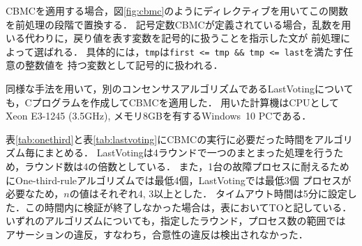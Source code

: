 \documentclass[technicalreport]{ieicej}
\theoremstyle{plain}
\begin{document}
CBMCを適用する場合，図\ref{fig:cbmc}のようにディレクティブを用いてこの関数を前処理の段階で置換する．
記号定数CBMCが定義されている場合，乱数を用いる代わりに，戻り値を表す変数を記号的に扱うことを指示した文が
前処理によって選ばれる．
具体的には，\verb|tmp|は\verb|first <= tmp && tmp <= last|を満たす任意の整数値を
持つ変数として記号的に扱われる．


%

同様な手法を用いて，別のコンセンサスアルゴリズムであるLastVoting\cite{HOjournal}についても，Cプログラムを作成してCBMCを適用した．
用いた計算機はCPUとしてXeon E3-1245 (3.5GHz), メモリ8GBを有するWindows~10 PCである．

表\ref{tab:onethird}と表\ref{tab:lastvoting}にCBMCの実行に必要だった時間をアルゴリズム毎にまとめる．
LastVotingは4ラウンドで一つのまとまった処理を行うため，ラウンド数は4の倍数としている．
また，1台の故障プロセスに耐えるためにOne-third-ruleアルゴリズムでは最低4個，LastVotingでは最低3個
プロセスが必要なため，$n$の値はそれぞれ4, 3以上とした．
タイムアウト時間は5分に設定した．この時間内に検証が終了しなかった場合は，表においてTOと記している．
いずれのアルゴリズムについても，指定したラウンド，プロセス数の範囲では
アサーションの違反，すなわち，合意性の違反は検出されなかった．
\end{document}
